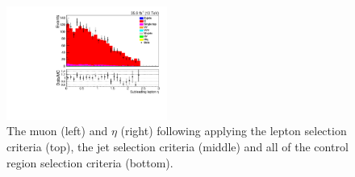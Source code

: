 \begin{figure}[h]
\includegraphics[width=0.47\textwidth]{figs/background-estimation/plots/unblinded/ttbar_control/lep2Eta_SingleTop_wMass_emu.pdf}
\caption{
The muon \pT (left) and $\eta$ (right) following applying the lepton selection criteria (top), the jet selection criteria (middle) and all of the \ttbar control region selection criteria (bottom).
}
\label{fig:ttbar_muon}
\end{figure}

